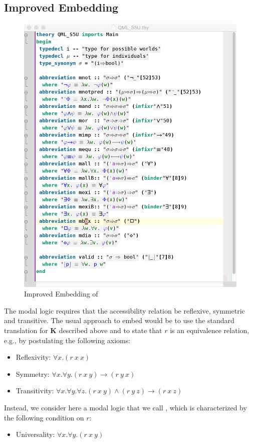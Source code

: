 \documentclass{article}
\begin{document}
\subsection{Improved Embedding}\label{sec:improvedembedding}
\begin{figure}[t]
\centerline{\includegraphics[width=1\columnwidth]{./Images/QML_S5U.png}}
\caption{Improved Embedding of \SFiveU} \label{QML_S5U}
\end{figure}

The modal logic \SFive requires that the accessibility relation be
reflexive, symmetric and transitive. The usual approach to embed
\SFive would be to use the standard translation for \textbf{K} described above
and to state that $r$ is an equivalence relation, e.g., by postulating
the following axioms:
\begin{itemize}
\item Reflexivity: $\forall x. (r~x~x)$
\item Symmetry: $\forall x. \forall y. (r~x~y) \rightarrow (r~y~x)$ 
\item Transitivity: $\forall x. \forall y. \forall z. (r~x~y) \wedge (r~y~z) \rightarrow (r~x~z)$
\end{itemize}
Instead, we consider here a modal logic that we call \SFiveU, which is
characterized by the following condition on $r$:
\begin{itemize}
\item Universality: $\forall x. \forall y. (r~x~y)$
\end{itemize}
\end{document}
